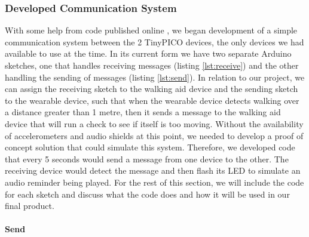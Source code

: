 \documentclass[12pt, a4paper]{report}
\begin{document}
{\subsubsection{Developed Communication System}

With some help from code published online \cite{random_nerd_tutorials}, we began development of a simple communication system between the 2 TinyPICO devices, the only devices we had available to use at the time. In its current form we have two separate Arduino sketches, one that handles receiving messages (listing \ref{lst:receive}) and the other handling the sending of messages (listing \ref{lst:send}). In relation to our project, we can assign the receiving sketch to the walking aid device and the sending sketch to the wearable device, such that when the wearable device detects walking over a distance greater than 1 metre, then it sends a message to the walking aid device that will run a check to see if itself is too moving. Without the availability of accelerometers and audio shields at this point, we needed to develop a proof of concept solution that could simulate this system. Therefore, we developed code that every 5 seconds would send a message from one device to the other. The receiving device would detect the message and then flash its LED to simulate an audio reminder being played. For the rest of this section, we will include the code for each sketch and discuss what the code does and how it will be used in our final product.

\paragraph{Send}



}
\end{document}
